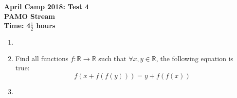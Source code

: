 \documentclass[a4paper,12pt]{article}
\begin{document}
\setcounter{page}{1}

\begin{center}
	\textbf{April Camp 2018: Test 4}\\
	\textbf{PAMO Stream}\\
	\textbf{Time: 4$\frac{1}{2}$ hours}
\end{center}

\begin{enumerate}
\vspace{0.2cm}

\item 

\item %
Find all functions $f: \mathbb{R}\to \mathbb{R}$ such that $\forall x,y \in \mathbb{R}$, the following equation is true:
\[f(x+f(f(y))) = y+f(f(x))\]

\item 

\end{enumerate}
\end{document}

